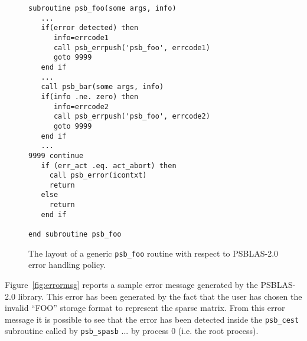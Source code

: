 \begin{figure}[h!]
  \begin{Sbox}
    \begin{minipage}[tl]{0.95\textwidth}
\small
\begin{lstlisting}
subroutine psb_foo(some args, info)
   ...
   if(error detected) then
      info=errcode1
      call psb_errpush('psb_foo', errcode1)
      goto 9999
   end if
   ...
   call psb_bar(some args, info)
   if(info .ne. zero) then
      info=errcode2
      call psb_errpush('psb_foo', errcode2)
      goto 9999
   end if
   ...
9999 continue
   if (err_act .eq. act_abort) then
     call psb_error(icontxt)
     return
   else
     return
   end if

end subroutine psb_foo
\end{lstlisting}
    \end{minipage}
  \end{Sbox}
  \setlength{\fboxsep}{8pt}
  \begin{center}
    \fbox{\TheSbox}
  \end{center}
  \caption{\label{fig:routerr}The layout of a generic \texttt{psb\_foo}
  routine with respect to PSBLAS-2.0 error handling policy.}
\end{figure}




Figure~\ref{fig:errormsg} reports a sample error message generated by
the PSBLAS-2.0 library. This error has been generated by the fact that
the user has chosen the invalid ``FOO'' storage format to represent
the sparse matrix. From this error message it is possible to see that
the error has been detected inside the \verb|psb_cest| subroutine
called by \verb|psb_spasb| ... by process 0 (i.e. the root process).


